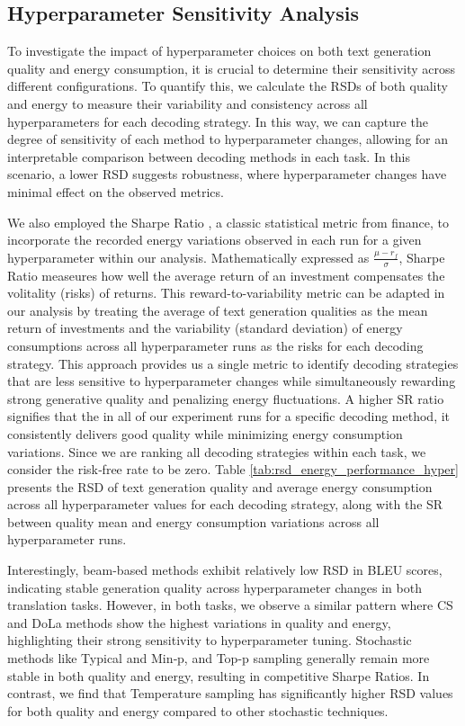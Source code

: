 \subsection{Hyperparameter Sensitivity Analysis}

To investigate the impact of hyperparameter choices on both text generation quality and energy consumption, it is crucial to determine their sensitivity across different configurations. To quantify this, we calculate the RSDs of both quality and energy to measure their variability and consistency across all hyperparameters for each decoding strategy. In this way, we can capture the degree of sensitivity of each method to hyperparameter changes, allowing for an interpretable comparison between decoding methods in each task. In this scenario, a lower RSD suggests robustness, where hyperparameter changes have minimal effect on the observed metrics. 

We also employed the Sharpe Ratio \cite{sharpe}, a classic statistical metric from finance, to incorporate the recorded energy variations observed in each run for a given hyperparameter within our analysis. Mathematically expressed as \(\frac{\mu - r_{f}}{\sigma}\), Sharpe Ratio measeures how well the average return of an investment compensates the volitality (risks) of returns. This reward-to-variability metric can be adapted in our analysis by treating the average of text generation qualities as the mean return of investments and the variability (standard deviation) of energy consumptions across all hyperparameter runs as the risks for each decoding strategy. This approach provides us a single metric to identify decoding strategies that are less sensitive to hyperparameter changes while simultaneously rewarding strong generative quality and penalizing energy fluctuations. A higher SR ratio signifies that the in all of our experiment runs for a specific decoding method, it consistently delivers good quality while minimizing energy consumption variations. Since we are ranking all decoding strategies within each task, we consider the risk‐free rate to be zero. Table \ref{tab:rsd_energy_performance_hyper} presents the RSD of text generation quality and average energy consumption across all hyperparameter values for each decoding strategy, along with the SR between quality mean and energy consumption variations across all hyperparameter runs.        

Interestingly, beam-based methods exhibit relatively low RSD in BLEU scores, indicating stable generation quality across hyperparameter changes in both translation tasks. However, in both tasks, we observe a similar pattern where CS and DoLa methods show the highest variations in quality and energy, highlighting their strong sensitivity to hyperparameter tuning. Stochastic methods like Typical and Min‐p, and Top-p sampling generally remain more stable in both quality and energy, resulting in competitive Sharpe Ratios. In contrast, we find that Temperature sampling has significantly higher RSD values for both quality and energy compared to other stochastic techniques. 

